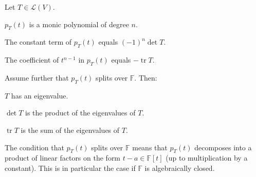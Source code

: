 \documentclass[article, a4paper, 11pt, oneside]{memoir}
\numberwithin{equation}{chapter}
\newcommand{\calL}{\mathcal{L}}
\DeclareMathOperator{\trace}{tr}
\newcommand{\field}{\mathbb{F}}
\begin{document}
\begin{proposition}
    Let $T \in \calL(V)$.
    \begin{enumprop}
        \item $p_T(t)$ is a monic polynomial of degree $n$.
        \item The constant term of $p_T(t)$ equals $(-1)^n \det T$.
        \item The coefficient of $t^{n-1}$ in $p_T(t)$ equals $-\trace T$.
    \end{enumprop}
    Assume further that $p_T(t)$ splits over $\field$. Then:
    \begin{enumprop}[resume]
        \item $T$ has an eigenvalue.
        \item $\det T$ is the product of the eigenvalues of $T$.
        \item $\trace T$ is the sum of the eigenvalues of $T$.
    \end{enumprop}
\end{proposition}
%
The condition that $p_T(t)$ splits over $\field$ means that $p_T(t)$ decomposes into a product of linear factors on the form $t - a \in \field[t]$ (up to multiplication by a constant). This is in particular the case if $\field$ is algebraically closed.
\end{document}
